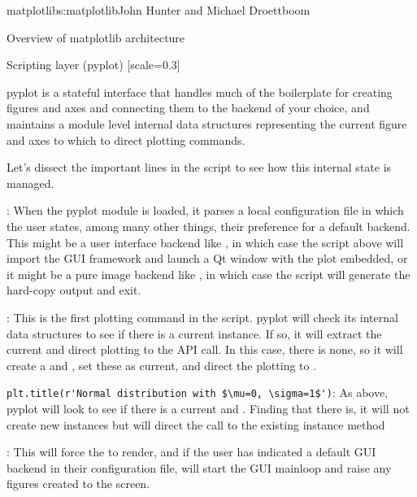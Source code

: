 \begin{aosachapter}{matplotlib}{s:matplotlib}{John Hunter and Michael Droettboom}
\begin{aosasect1}{Overview of matplotlib architecture}
\begin{aosasect2}{Scripting layer (pyplot)}
[scale=0.3]


pyplot is a stateful interface that handles much of the boilerplate
for creating figures and axes and connecting them to the backend of
your choice, and maintains a module level internal data structures
representing the current figure and axes to which to direct plotting
commands.

Let's dissect the important lines in the script to see how this
internal state is managed.

\begin{aosaitemize}

\item {}: When the pyplot module
  is loaded, it parses a local configuration file in which the user
  states, among many other things, their preference for a default
  backend.  This might be a user interface backend like ,
  in which case the script above will import the GUI framework and
  launch a Qt window with the plot embedded, or it might be a pure
  image backend like , in which case the script will
  generate the hard-copy output and exit.

\item {}: This is the first plotting command in
  the script.  pyplot will check its internal data structures to see
  if there is a current  instance.  If so, it will
  extract the current  and direct plotting to the
   API call.  In this case, there is none, so it will
  create a  and , set these as current, and
  direct the plotting to .

\item \verb+plt.title(r'Normal distribution with $\mu=0, \sigma=1$')+:
  As above, pyplot will look to see if there is a
  current  and .  Finding that there is, it
  will not create new instances but will direct the call to the
  existing  instance method 

\item {}: This will force the  to render,
  and if the user has indicated a default GUI backend in their
  configuration file, will start the GUI mainloop and raise any
  figures created to the screen.

\end{aosaitemize}


\end{aosasect2}
\end{aosasect1}
\end{aosachapter}

